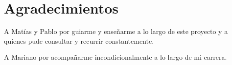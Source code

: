 \chapter*{Agradecimientos}

\noindent A Matías y Pablo por guiarme y enseñarme a lo largo de este proyecto y a quienes pude consultar y recurrir constantemente. 

\noindent A Mariano por acompañarme incondicionalmente a lo largo de mi carrera. 
